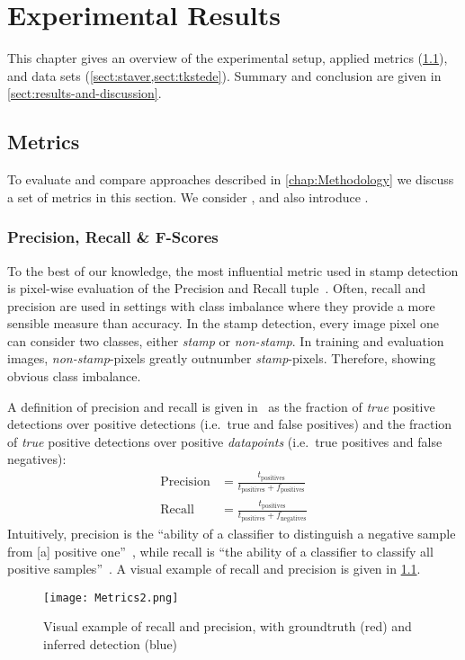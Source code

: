 \chapter{Experimental Results}
This chapter gives an overview of the experimental setup, applied metrics
(\cref{sect:metrics}), and data sets (\cref{sect:staver,sect:tkstede}). Summary
and conclusion are given in \cref{sect:results-and-discussion}.

\section{Metrics}\label{sect:metrics}
To evaluate and compare approaches described in \cref{chap:Methodology} we
discuss a set of metrics in this section. We consider
,  and also
introduce .

\subsection{Precision, Recall \& F-Scores}\label{subsect:precision-recall-fscores}
To the best of our knowledge, the most influential metric used in stamp 
detection is pixel-wise evaluation of the Precision and Recall
tuple~\cite{Nandedkar.2015121620151219,Younas.2017110920171115,
Ahmed.2013082520130828,Dey.2015121620151219,
Micenkova.2011091820110921, Bhalgat.16.09.2016, Micenkova.2015,
Nandedkar.2015082320150826}. Often, recall and precision are used in settings
with class imbalance where they provide a more sensible measure than accuracy.
In the stamp detection, every image pixel one can consider two classes, either
\textit{stamp} or \textit{non-stamp}. In training and evaluation images,
\textit{non-stamp}-pixels greatly outnumber \textit{stamp}-pixels. Therefore,
showing obvious class imbalance.
\par
A definition of precision and recall is given
in~\cite[423]{Goodfellow.2016} as the fraction of \textit{true} positive
detections over positive detections (i.e.\ true and false positives) and the
fraction of \textit{true} positive detections over positive \textit{datapoints}
(i.e.\ true positives and false negatives):
\begin{align}
    \text{Precision} &= \frac{t_\text{positives}}{t_\text{positives} + f_\text{positives}}\\
    \text{Recall} &= \frac{t_\text{positives}}{t_\text{positives} + f_\text{negatives}}
\end{align}
Intuitively, precision is the ``ability of a classifier to distinguish a
negative sample from [a] positive one''~\cite{Younas.2017110920171115}, while
recall is ``the ability of a classifier to classify all positive samples''~\cite{Younas.2017110920171115}.
A visual example of recall and precision is given in
\cref{fig:visual-precision-recall}.
\begin{figure}
    \center
    \texttt{[image: Metrics2.png]}
    \caption{Visual example of recall and precision, with groundtruth (red) and
    inferred detection (blue)}\label{fig:visual-precision-recall}
\end{figure}



